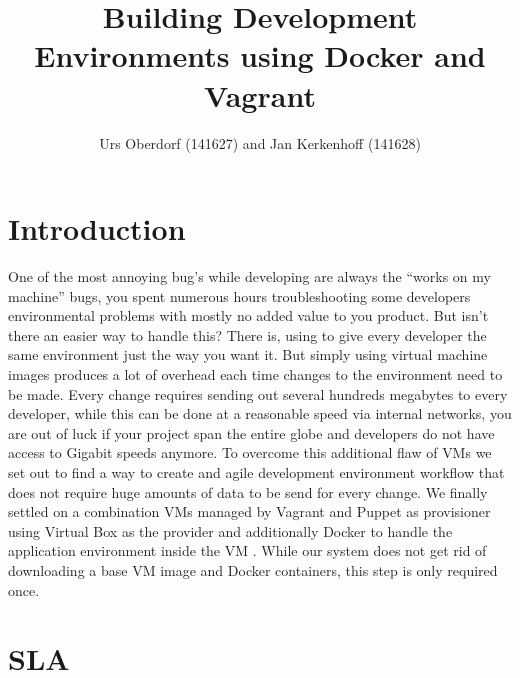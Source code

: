 

\title{Building Development Environments using Docker and Vagrant }
\author{Urs Oberdorf (141627) and Jan Kerkenhoff (141628)}



\maketitle


\thispagestyle{empty}

\clearpage
{}
\setcounter{page}{1}
\tableofcontents

\clearpage
{}

\section{Introduction}

One of the most annoying bug’s while developing are always the “works on my machine” bugs, you spent numerous hours troubleshooting some developers environmental problems with mostly no added value to you product. But isn’t there an easier way to handle this? There is, using to give every developer the same environment just the way you want it. But simply using virtual machine images produces a lot of overhead each time changes to the environment need to be made. Every change requires sending out several hundreds megabytes to every developer, while this can be done at a reasonable speed via internal networks, you are out of luck if your project span the entire globe and developers do not have access to Gigabit speeds anymore. To overcome this additional flaw of \glspl{VM} we set out to find a way to create and agile development environment workflow that does not require huge amounts of data to be send for every change.
We finally settled on a combination \glspl{VM} managed by Vagrant and Puppet as \gls{provisioner} using Virtual Box as the \gls{provider} and additionally Docker to handle the application environment inside the \gls{VM} . While our system does not get rid of downloading a base \gls{VM} image and Docker containers, this step is only required once.


\section{SLA}

